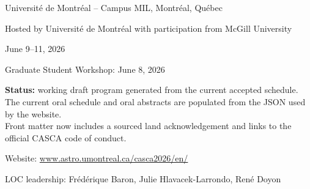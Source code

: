 {\large Universit\'e de Montr\'eal -- Campus MIL, Montr\'eal, Qu\'ebec\par}
{\normalsize Hosted by Universit\'e de Montr\'eal with participation from McGill University\par}
\vspace{0.3cm}
{\large June 9--11, 2026\par}
{\normalsize Graduate Student Workshop: June 8, 2026\par}
\vfill

\begin{center}
  \setlength{\fboxsep}{14pt}
  \colorbox{nightpanel}{%
    \begin{minipage}{0.82\textwidth}
      \centering
      \color{starlight}
      \textbf{Status:} working draft program generated from the current accepted schedule.\\[0.5em]
      The current oral schedule and oral abstracts are populated from the JSON used by the website.\\
      Front matter now includes a sourced land acknowledgement and links to the official CASCA code of conduct.
    \end{minipage}%
  }
\end{center}

\vfill
{\small Website: \href{https://www.astro.umontreal.ca/casca2026/en/}{www.astro.umontreal.ca/casca2026/en/}\par}
{\small LOC leadership: Fr\'ed\'erique Baron, Julie Hlavacek-Larrondo, Ren\'e Doyon\par}